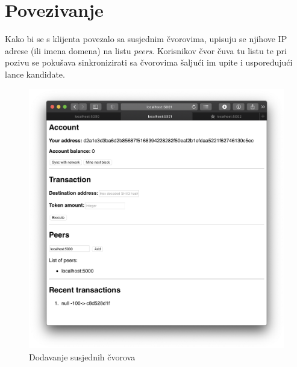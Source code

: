 \documentclass[utf8, zavrsni]{fer}
\begin{document}
\newpage
\section{Povezivanje}
Kako bi se s klijenta povezalo sa susjednim čvorovima, upisuju se njihove IP adrese (ili imena domena) na listu \textit{peers}. Korisnikov čvor čuva tu listu te pri pozivu  se pokušava sinkronizirati sa čvorovima šaljući im upite i uspoređujući lance kandidate.
\begin{figure}[H]
    \centering
    \includegraphics[width=\textwidth]{dodavanje_ip_adrese_susjeda.png}
    \caption{Dodavanje susjednih čvorova}
    \label{fig:dodaj_ip}
\end{figure}

\newpage
\end{document}
